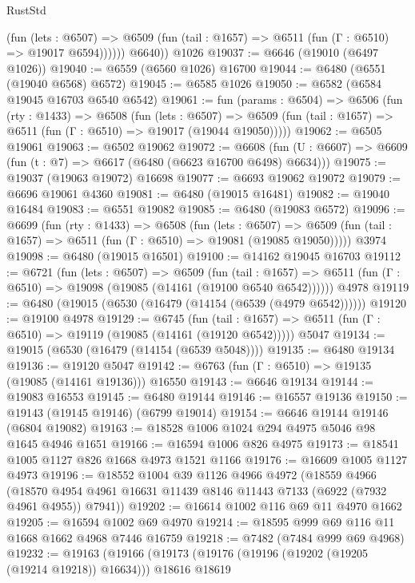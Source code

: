 \begin{lexlean}{RustStd}
\begin{coremodule}
              (fun (lets : @6507) =>
              @6509 (fun (tail : @1657) => @6511 (fun (Γ : @6510) => @19017 @6594))))))
        @6640))
    @1026
@19037 := @6646 (@19010 (@6497 @1026))
@19040 := @6559 (@6560 @1026) @16700
@19044 := @6480 (@6551 (@19040 @6568) @6572)
@19045 := @6585 @1026
@19050 := @6582 (@6584 @19045 @16703 @6540 @6542)
@19061 := fun (params : @6504) =>
  @6506
    (fun (rty : @1433) =>
    @6508
      (fun (lets : @6507) =>
      @6509 (fun (tail : @1657) => @6511 (fun (Γ : @6510) => @19017 (@19044 @19050)))))
@19062 := @6505 @19061
@19063 := @6502 @19062
@19072 := @6608
    (fun (U : @6607) => @6609 (fun (t : @7) => @6617 (@6480 (@6623 @16700 @6498) @6634)))
@19075 := @19037 (@19063 @19072) @16698
@19077 := @6693 @19062 @19072
@19079 := @6696 @19061 @4360
@19081 := @6480 (@19015 @16481)
@19082 := @19040 @16484
@19083 := @6551 @19082
@19085 := @6480 (@19083 @6572)
@19096 := @6699
    (fun (rty : @1433) =>
    @6508
      (fun (lets : @6507) =>
      @6509 (fun (tail : @1657) => @6511 (fun (Γ : @6510) => @19081 (@19085 @19050)))))
    @3974
@19098 := @6480 (@19015 @16501)
@19100 := @14162 @19045 @16703
@19112 := @6721
    (fun (lets : @6507) =>
    @6509
      (fun (tail : @1657) =>
      @6511 (fun (Γ : @6510) => @19098 (@19085 (@14161 (@19100 @6540 @6542))))))
    @4978
@19119 := @6480 (@19015 (@6530 (@16479 (@14154 (@6539 (@4979 @6542))))))
@19120 := @19100 @4978
@19129 := @6745
    (fun (tail : @1657) => @6511 (fun (Γ : @6510) => @19119 (@19085 (@14161 (@19120 @6542)))))
    @5047
@19134 := @19015 (@6530 (@16479 (@14154 (@6539 @5048))))
@19135 := @6480 @19134
@19136 := @19120 @5047
@19142 := @6763 (fun (Γ : @6510) => @19135 (@19085 (@14161 @19136))) @16550
@19143 := @6646 @19134
@19144 := @19083 @16553
@19145 := @6480 @19144
@19146 := @16557 @19136
@19150 := @19143 (@19145 @19146) (@6799 @19014)
@19154 := @6646 @19144 @19146 (@6804 @19082)
@19163 := @18528 @1006 @1024 @294 @4975 @5046 @98 @1645 @4946 @1651
@19166 := @16594 @1006 @826 @4975
@19173 := @18541 @1005 @1127 @826 @1668 @4973 @1521 @1166
@19176 := @16609 @1005 @1127 @4973
@19196 := @18552
    @1004
    @39
    @1126
    @4966
    @4972
    (@18559
      @4966
      (@18570 @4954 @4961 @16631 @11439 @8146 @11443 @7133 (@6922 (@7932 @4961 @4955)) @7941))
@19202 := @16614 @1002 @116 @69 @11 @4970 @1662
@19205 := @16594 @1002 @69 @4970
@19214 := @18595 @999 @69 @116 @11 @1668 @1662 @4968 @7446 @16759
@19218 := @7482 (@7484 @999 @69 @4968)
@19232 := @19163
    (@19166
      (@19173
        (@19176 (@19196 (@19202 (@19205 (@19214 @19218)) @16634)))
        @18616
        @18619

\end{coremodule}
\end{lexlean}
